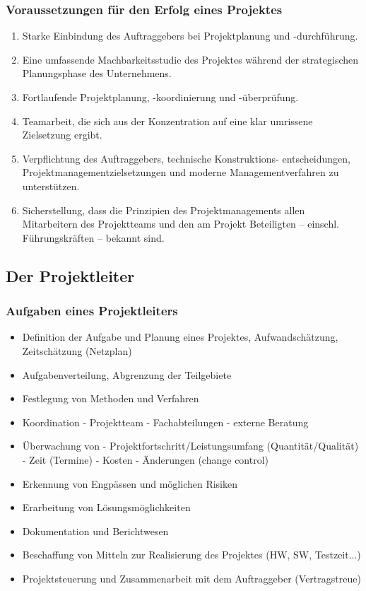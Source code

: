 \documentclass[11pt,a4paper]{article}
\begin{document}
\subsubsection{Voraussetzungen für den Erfolg eines Projektes}

\begin{enumerate}
\item Starke Einbindung des Auftraggebers bei Projektplanung
und -durchführung.

\item Eine umfassende Machbarkeitsstudie des Projektes während der
strategischen Planungsphase des Unternehmens.

\item Fortlaufende Projektplanung, -koordinierung und -überprüfung.

\item Teamarbeit, die sich aus der Konzentration auf eine klar
umrissene Zielsetzung ergibt.

\item Verpflichtung des Auftraggebers, technische Konstruktions-
entscheidungen, Projektmanagementzielsetzungen und moderne
Managementverfahren zu unterstützen.

\item Sicherstellung, dass die Prinzipien des Projektmanagements
allen Mitarbeitern des Projektteams und den am Projekt
Beteiligten – einschl. Führungskräften – bekannt sind.
\end{enumerate}

\subsection{Der Projektleiter}

\subsubsection{Aufgaben eines Projektleiters}
\begin{itemize}
\item Definition der Aufgabe und Planung eines Projektes, Aufwandschätzung,
Zeitschätzung (Netzplan)
\item Aufgabenverteilung, Abgrenzung der Teilgebiete
\item Festlegung von Methoden und Verfahren
\item Koordination - Projektteam
- Fachabteilungen
- externe Beratung
\item Überwachung von - Projektfortschritt/Leistungsumfang (Quantität/Qualität)
- Zeit (Termine)
- Kosten
- Änderungen (change control)
\item Erkennung von Engpässen und möglichen Risiken
\item Erarbeitung von Lösungsmöglichkeiten
\item Dokumentation und Berichtwesen
\item Beschaffung von Mitteln zur Realisierung des Projektes (HW, SW, Testzeit...)
\item Projektsteuerung und Zusammenarbeit mit dem Auftraggeber (Vertragstreue)
\end{itemize}
\end{document}

